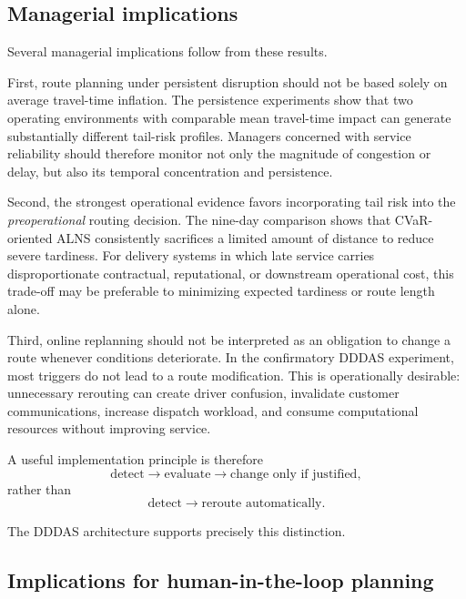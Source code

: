 \documentclass[preprint,12pt]{elsarticle}
\newcommand{\1}{\mathbf{1}}
\begin{document}
\subsection{Managerial implications}
\label{subsec:managerial}

Several managerial implications follow from these results.

First, route planning under persistent disruption should not be based solely on
average travel-time inflation. The persistence experiments show that two
operating environments with comparable mean travel-time impact can generate
substantially different tail-risk profiles. Managers concerned with service
reliability should therefore monitor not only the magnitude of congestion or
delay, but also its temporal concentration and persistence.

Second, the strongest operational evidence favors incorporating tail risk into
the \emph{preoperational} routing decision. The nine-day comparison shows that
CVaR-oriented ALNS consistently sacrifices a limited amount of distance to
reduce severe tardiness. For delivery systems in which late service carries
disproportionate contractual, reputational, or downstream operational cost,
this trade-off may be preferable to minimizing expected tardiness or route
length alone.

Third, online replanning should not be interpreted as an obligation to change a
route whenever conditions deteriorate. In the confirmatory DDDAS experiment,
most triggers do not lead to a route modification. This is operationally
desirable: unnecessary rerouting can create driver confusion, invalidate
customer communications, increase dispatch workload, and consume computational
resources without improving service.

A useful implementation principle is therefore
\[
\text{detect} \rightarrow
\text{evaluate} \rightarrow
\text{change only if justified},
\]
rather than
\[
\text{detect} \rightarrow
\text{reroute automatically}.
\]

The DDDAS architecture supports precisely this distinction.

\subsection{Implications for human-in-the-loop planning}
\label{subsec:human_loop}
\end{document}
